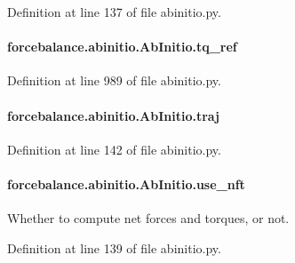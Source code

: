 Definition at line 137 of file abinitio.\-py.

\hypertarget{classforcebalance_1_1abinitio_1_1AbInitio_aadda7244869b583a4533317615c421e1}{
\paragraph[{tq\-\_\-ref}]{\setlength{\rightskip}{0pt plus 5cm}forcebalance.\-abinitio.\-Ab\-Initio.\-tq\-\_\-ref}}\label{classforcebalance_1_1abinitio_1_1AbInitio_aadda7244869b583a4533317615c421e1}


Definition at line 989 of file abinitio.\-py.

\hypertarget{classforcebalance_1_1abinitio_1_1AbInitio_a7b52d5101bfa4fde7129c84c0558ad14}{
\paragraph[{traj}]{\setlength{\rightskip}{0pt plus 5cm}forcebalance.\-abinitio.\-Ab\-Initio.\-traj}}\label{classforcebalance_1_1abinitio_1_1AbInitio_a7b52d5101bfa4fde7129c84c0558ad14}


Definition at line 142 of file abinitio.\-py.

\hypertarget{classforcebalance_1_1abinitio_1_1AbInitio_afd8d179560a295ffa6c6309843c59279}{
\paragraph[{use\-\_\-nft}]{\setlength{\rightskip}{0pt plus 5cm}forcebalance.\-abinitio.\-Ab\-Initio.\-use\-\_\-nft}}\label{classforcebalance_1_1abinitio_1_1AbInitio_afd8d179560a295ffa6c6309843c59279}


Whether to compute net forces and torques, or not. 



Definition at line 139 of file abinitio.\-py.

